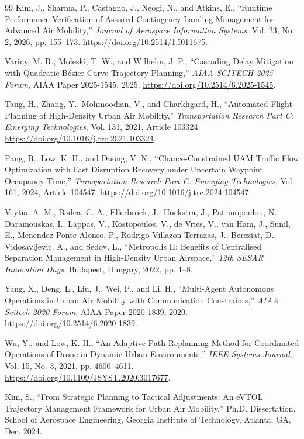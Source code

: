 \documentclass[11pt,letterpaper]{article}
\begin{document}
\begin{thebibliography}{99}
Kim, J., Sharma, P., Castagno, J., Neogi, N., and Atkins, E., ``Runtime Performance Verification of Assured Contingency Landing Management for Advanced Air Mobility,'' \emph{Journal of Aerospace Information Systems}, Vol. 23, No. 2, 2026, pp. 155--173. \url{https://doi.org/10.2514/1.I011675}.

Variny, M. R., Moleski, T. W., and Wilhelm, J. P., ``Cascading Delay Mitigation with Quadratic B\'{e}zier Curve Trajectory Planning,'' \emph{AIAA SCITECH 2025 Forum}, AIAA Paper 2025-1545, 2025. \url{https://doi.org/10.2514/6.2025-1545}.

Tang, H., Zhang, Y., Mohmoodian, V., and Charkhgard, H., ``Automated Flight Planning of High-Density Urban Air Mobility,'' \emph{Transportation Research Part C: Emerging Technologies}, Vol. 131, 2021, Article 103324. \url{https://doi.org/10.1016/j.trc.2021.103324}.

Pang, B., Low, K. H., and Duong, V. N., ``Chance-Constrained UAM Traffic Flow Optimization with Fast Disruption Recovery under Uncertain Waypoint Occupancy Time,'' \emph{Transportation Research Part C: Emerging Technologies}, Vol. 161, 2024, Article 104547. \url{https://doi.org/10.1016/j.trc.2024.104547}.

Veytia, A. M., Badea, C. A., Ellerbroek, J., Hoekstra, J., Patrinopoulou, N., Daramouskas, I., Lappas, V., Kostopoulos, V., de Vries, V., van Ham, J., Sunil, E., Menendez Ponte Alonso, P., Rodrigo Villazon Terrazas, J., Bereziat, D., Vidosavljevic, A., and Sedov, L., ``Metropolis II: Benefits of Centralised Separation Management in High-Density Urban Airspace,'' \emph{12th SESAR Innovation Days}, Budapest, Hungary, 2022, pp. 1--8.

Yang, X., Deng, L., Liu, J., Wei, P., and Li, H., ``Multi-Agent Autonomous Operations in Urban Air Mobility with Communication Constraints,'' \emph{AIAA Scitech 2020 Forum}, AIAA Paper 2020-1839, 2020. \url{https://doi.org/10.2514/6.2020-1839}.

Wu, Y., and Low, K. H., ``An Adaptive Path Replanning Method for Coordinated Operations of Drone in Dynamic Urban Environments,'' \emph{IEEE Systems Journal}, Vol. 15, No. 3, 2021, pp. 4600--4611. \url{https://doi.org/10.1109/JSYST.2020.3017677}.

Kim, S., ``From Strategic Planning to Tactical Adjustments: An eVTOL Trajectory Management Framework for Urban Air Mobility,'' Ph.D. Dissertation, School of Aerospace Engineering, Georgia Institute of Technology, Atlanta, GA, Dec. 2024.


\end{thebibliography}
\end{document}

